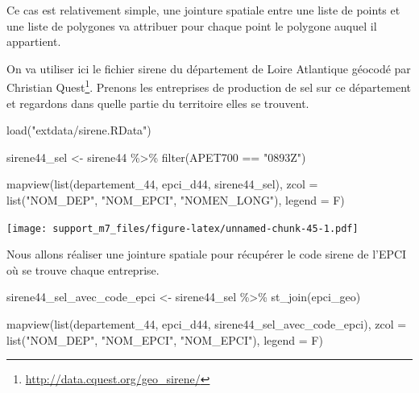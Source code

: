 \documentclass[
]{book}
\newenvironment{Shaded}{\begin{snugshade}}{\end{snugshade}}
\newcommand{\AttributeTok}[1]{\textcolor[rgb]{0.77,0.63,0.00}{#1}}
\newcommand{\FunctionTok}[1]{\textcolor[rgb]{0.00,0.00,0.00}{#1}}
\newcommand{\NormalTok}[1]{#1}
\newcommand{\OtherTok}[1]{\textcolor[rgb]{0.56,0.35,0.01}{#1}}
\newcommand{\SpecialCharTok}[1]{\textcolor[rgb]{0.00,0.00,0.00}{#1}}
\newcommand{\StringTok}[1]{\textcolor[rgb]{0.31,0.60,0.02}{#1}}
\begin{document}
Ce cas est relativement simple, une jointure spatiale entre une liste de points et une liste de polygones va attribuer pour chaque point le polygone auquel il appartient.

On va utiliser ici le fichier sirene du département de Loire Atlantique géocodé par Christian Quest\footnote{\url{http://data.cquest.org/geo_sirene/}}.
Prenons les entreprises de production de sel sur ce département et regardons dans quelle partie du territoire elles se trouvent.

\begin{Shaded}
\begin{Highlighting}[]
\FunctionTok{load}\NormalTok{(}\StringTok{"extdata/sirene.RData"}\NormalTok{)}
\end{Highlighting}
\end{Shaded}

\begin{Shaded}
\begin{Highlighting}[]
\NormalTok{sirene44\_sel }\OtherTok{\textless{}{-}}\NormalTok{ sirene44 }\SpecialCharTok{\%\textgreater{}\%}
  \FunctionTok{filter}\NormalTok{(APET700 }\SpecialCharTok{==} \StringTok{"0893Z"}\NormalTok{)}

\FunctionTok{mapview}\NormalTok{(}\FunctionTok{list}\NormalTok{(departement\_44, epci\_d44, sirene44\_sel), }\AttributeTok{zcol =} \FunctionTok{list}\NormalTok{(}\StringTok{"NOM\_DEP"}\NormalTok{, }\StringTok{"NOM\_EPCI"}\NormalTok{, }\StringTok{"NOMEN\_LONG"}\NormalTok{), }\AttributeTok{legend =}\NormalTok{ F)}
\end{Highlighting}
\end{Shaded}

\texttt{[image: support\_m7\_files/figure-latex/unnamed-chunk-45-1.pdf]}

Nous allons réaliser une jointure spatiale pour récupérer le code sirene de l'EPCI où se trouve chaque entreprise.

\begin{Shaded}
\begin{Highlighting}[]
\NormalTok{sirene44\_sel\_avec\_code\_epci }\OtherTok{\textless{}{-}}\NormalTok{ sirene44\_sel }\SpecialCharTok{\%\textgreater{}\%}
  \FunctionTok{st\_join}\NormalTok{(epci\_geo)}
\end{Highlighting}
\end{Shaded}

\begin{Shaded}
\begin{Highlighting}[]
\FunctionTok{mapview}\NormalTok{(}\FunctionTok{list}\NormalTok{(departement\_44, epci\_d44, sirene44\_sel\_avec\_code\_epci), }\AttributeTok{zcol =} \FunctionTok{list}\NormalTok{(}\StringTok{"NOM\_DEP"}\NormalTok{, }\StringTok{"NOM\_EPCI"}\NormalTok{, }\StringTok{"NOM\_EPCI"}\NormalTok{), }\AttributeTok{legend =}\NormalTok{ F)}
\end{Highlighting}
\end{Shaded}
\end{document}

